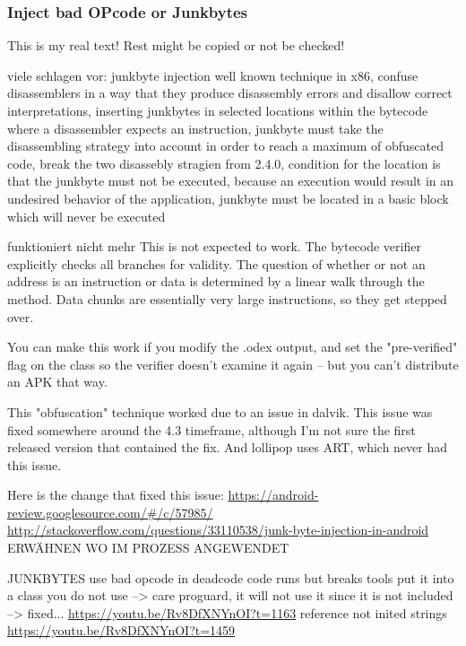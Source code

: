 \subsubsection{Inject bad OPcode or Junkbytes} \label{subsubsection:counter-reengineering-break-inject}
This is my real text! Rest might be copied or not be checked!


%
viele schlagen vor:
junkbyte injection
well known technique in x86, confuse disassemblers in a way that they produce disassembly errors and disallow correct interpretations, inserting junkbytes in selected locations within the bytecode where a disassembler expects an instruction, junkbyte must take the disassembling strategy into account in order to reach a maximum of obfuscated code, break the two disassebly stragien from 2.4.0, condition for the location is that the junkbyte must not be executed, because an execution would result in an undesired behavior of the application,  junkbyte must be located in a basic block which will never be executed
\cite{schulzLabCourse}
%


funktioniert nicht mehr
This is not expected to work. The bytecode verifier explicitly checks all branches for validity. The question of whether or not an address is an instruction or data is determined by a linear walk through the method. Data chunks are essentially very large instructions, so they get stepped over.

You can make this work if you modify the .odex output, and set the "pre-verified" flag on the class so the verifier doesn't examine it again -- but you can't distribute an APK that way.

This "obfuscation" technique worked due to an issue in dalvik. This issue was fixed somewhere around the 4.3 timeframe, although I'm not sure the first released version that contained the fix. And lollipop uses ART, which never had this issue.

Here is the change that fixed this issue: \url{https://android-review.googlesource.com/#/c/57985/}
\url{http://stackoverflow.com/questions/33110538/junk-byte-injection-in-android}
%
ERWÄHNEN WO IM PROZESS ANGEWENDET\newline

JUNKBYTES\newline
use bad opcode in deadcode \newline
code runs but breaks tools\newline
put it into a class you do not use --> care proguard, it will not use it since it is not included\newline
--> fixed...\newline
\url{https://youtu.be/Rv8DfXNYnOI?t=1163}\newline
reference not inited strings\newline
\url{https://youtu.be/Rv8DfXNYnOI?t=1459}
